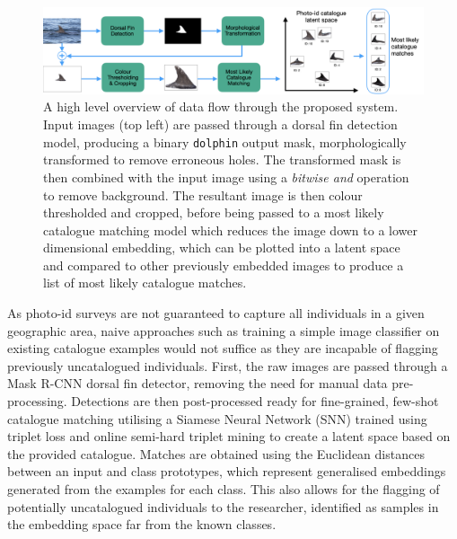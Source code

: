 \begin{figure}
	\begin{center}
		\includegraphics[width=\linewidth]{Chapter1/figs/pipeline_compact.png}
	\end{center}
	\caption[A high level overview of data flow through the proposed system.]{A high level overview of data flow through the proposed system. Input images (top left) are passed through a dorsal fin detection model, producing a binary \texttt{dolphin} output mask, morphologically transformed to remove erroneous holes. The transformed mask is then combined with the input image using a \textit{bitwise and} operation to remove background. The resultant image is then colour thresholded and cropped, before being passed to a most likely catalogue matching model which reduces the image down to a lower dimensional embedding, which can be plotted into a latent space and compared to other previously embedded images to produce a list of most likely catalogue matches.}
	\label{fig:pipeline}
\end{figure}

As photo-id surveys are not guaranteed to capture all individuals in a given geographic area, naive approaches such as training a simple image classifier on existing catalogue examples would not suffice as they are incapable of flagging previously uncatalogued individuals. First, the raw images are passed through a Mask R-CNN \cite{he_mask_2017} dorsal fin detector, removing the need for manual data pre-processing. Detections are then post-processed ready for fine-grained, few-shot catalogue matching utilising a Siamese Neural Network (SNN) \cite{dey_signet_2017} trained using triplet loss \cite{schroff_facenet_2015} and online semi-hard triplet mining to create a latent space based on the provided catalogue. Matches are obtained using the Euclidean distances between an input and class prototypes, which represent generalised embeddings generated from the examples for each class. This also allows for the flagging of potentially uncatalogued individuals to the researcher, identified as samples in the embedding space far from the known classes.

